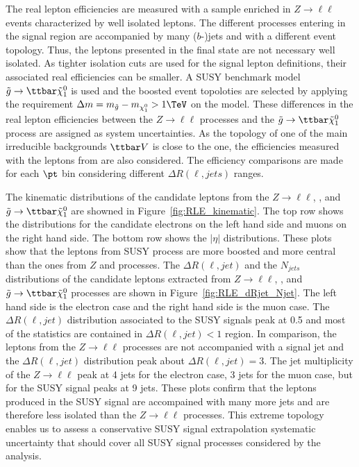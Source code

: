 The real lepton efficiencies are measured with a sample enriched in $Z\to \ell\ell$ events characterized by well isolated leptons.
The different processes entering in the signal region are accompanied by many ($b$-)jets and with a different event topology.
Thus, the leptons presented in the final state are not necessary well isolated.
As tighter isolation cuts are used for the signal lepton definitions, their associated real efficiencies can be smaller.
A SUSY benchmark model 
$\tilde{g}\to\ttbar\tilde{\chi}^{0}_{1}$ 
is used and the boosted event topoloties are selected by applying the requirement 
$\Delta m=m_{\tilde{g}}-m_{\chi^{0}_{1}}>1 \TeV$ 
on the model.
These differences in the real lepton efficiencies between the $Z\to \ell\ell$ processes and the $\tilde{g}\to\ttbar\tilde{\chi}^{0}_{1}$ process are assigned as system uncertainties.
As the topology of one of the main irreducible backgrounds $\ttbar V$ is close to the \ttbar one, the efficiencies measured with the leptons from \ttbar are also considered.
The efficiency comparisons are made for each $\pt$ bin considering different $\Delta R(\ell, jets)$ ranges.

The kinematic distributions of the candidate leptons from the $Z\to \ell\ell$, \ttbar, and $\tilde{g}\to\ttbar\tilde{\chi}^{0}_{1}$ are showned in Figure~\ref{fig:RLE_kinematic}.
The top row shows the \pt distributions for the candidate electrons on the left hand side and muons on the right hand side.
The bottom row shows the $|\eta|$ distributions.
These plots show that the leptons from SUSY process are more boosted and more central than the ones from $Z$ and \ttbar processes.
The $\Delta R(\ell, jet)$ and the $N_{jets}$ distributions of the candidate leptons extracted from $Z\to\ell\ell$, \ttbar, and $\tilde{g}\to\ttbar\tilde{\chi}^{0}_{1}$ processes are shown in Figure~\ref{fig:RLE_dRjet_Njet}.
The left hand side is the electron case and the right hand side is the muon case.
The $\Delta R(\ell, jet)$ distribution associated to the SUSY signals peak at 0.5 and most of the statistics are contained in $\Delta R(\ell, jet)<1$ region.
In comparison, the leptons from the $Z\to\ell\ell$ processes are not accompanied with a signal jet and the $\Delta R(\ell, jet)$ distribution peak about $\Delta R(\ell, jet)=3$.
The jet multiplicity of the $Z\to\ell\ell$ peak at 4 jets for the electron case, 3 jets for the muon case, but for the SUSY signal peaks at 9 jets.
These plots confirm that the leptons produced in the SUSY signal are accompained with many more jets and are therefore less isolated than the $Z\to\ell\ell$ processes.
This extreme topology enables us to assess a conservative SUSY signal extrapolation systematic uncertainty that should cover all SUSY signal processes considered by the analysis.

